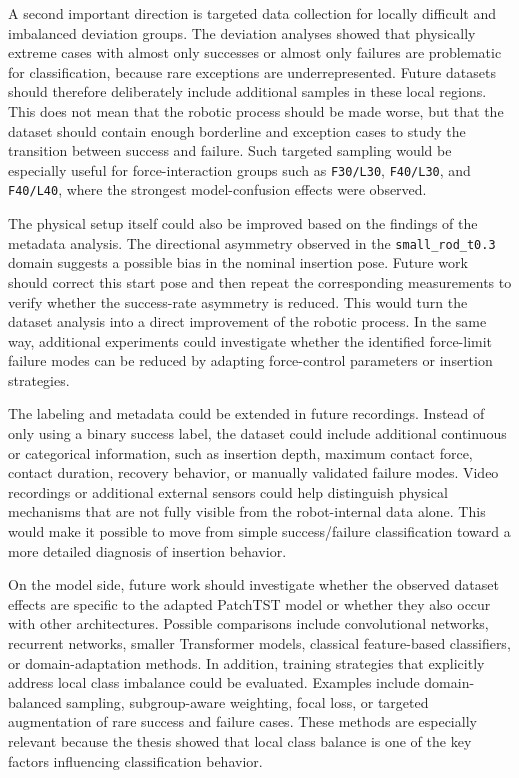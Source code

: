 A second important direction is targeted data collection for locally difficult and imbalanced deviation groups. The deviation analyses showed that physically extreme cases with almost only successes or almost only failures are problematic for classification, because rare exceptions are underrepresented. Future datasets should therefore deliberately include additional samples in these local regions. This does not mean that the robotic process should be made worse, but that the dataset should contain enough borderline and exception cases to study the transition between success and failure. Such targeted sampling would be especially useful for force-interaction groups such as \texttt{F30/L30}, \texttt{F40/L30}, and \texttt{F40/L40}, where the strongest model-confusion effects were observed.

The physical setup itself could also be improved based on the findings of the metadata analysis. The directional asymmetry observed in the \texttt{small\_rod\_t0.3} domain suggests a possible bias in the nominal insertion pose. Future work should correct this start pose and then repeat the corresponding measurements to verify whether the success-rate asymmetry is reduced. This would turn the dataset analysis into a direct improvement of the robotic process. In the same way, additional experiments could investigate whether the identified force-limit failure modes can be reduced by adapting force-control parameters or insertion strategies.

The labeling and metadata could be extended in future recordings. Instead of only using a binary success label, the dataset could include additional continuous or categorical information, such as insertion depth, maximum contact force, contact duration, recovery behavior, or manually validated failure modes. Video recordings or additional external sensors could help distinguish physical mechanisms that are not fully visible from the robot-internal data alone. This would make it possible to move from simple success/failure classification toward a more detailed diagnosis of insertion behavior.

On the model side, future work should investigate whether the observed dataset effects are specific to the adapted PatchTST model or whether they also occur with other architectures. Possible comparisons include convolutional networks, recurrent networks, smaller Transformer models, classical feature-based classifiers, or domain-adaptation methods. In addition, training strategies that explicitly address local class imbalance could be evaluated. Examples include domain-balanced sampling, subgroup-aware weighting, focal loss, or targeted augmentation of rare success and failure cases. These methods are especially relevant because the thesis showed that local class balance is one of the key factors influencing classification behavior.

